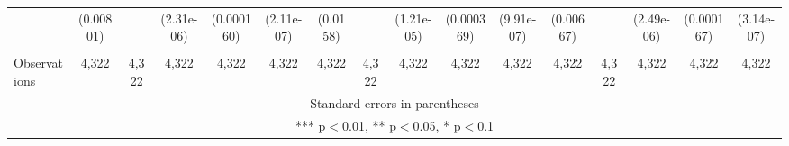 \documentclass[]{article}
\begin{document}
\begin{tabular}{lccccccccccccccc}
 & (0.00801) &  & (2.31e-06) & (0.000160) & (2.11e-07) & (0.0158) &  & (1.21e-05) & (0.000369) & (9.91e-07) & (0.00667) &  & (2.49e-06) & (0.000167) & (3.14e-07) \\
 &  &  &  &  &  &  &  &  &  &  &  &  &  &  &  \\
 Observations & 4,322 & 4,322 & 4,322 & 4,322 & 4,322 & 4,322 & 4,322 & 4,322 & 4,322 & 4,322 & 4,322 & 4,322 & 4,322 & 4,322 & 4,322 \\ \hline
\multicolumn{16}{c}{ Standard errors in parentheses} \\
\multicolumn{16}{c}{ *** p$<$0.01, ** p$<$0.05, * p$<$0.1} \\
\end{tabular}
\end{document}
